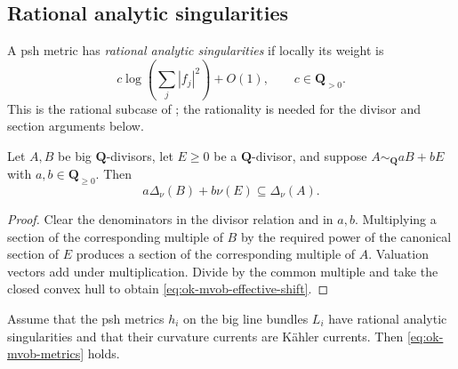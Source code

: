 \subsection{Rational analytic singularities}
\label{sec:ok-mixed-analytic}

\begin{definition}\label{def:ok-rational-analytic}
A psh metric has \emph{rational analytic singularities} if locally its
weight is
\[
 c\log\!\left(\sum_j|f_j|^2\right)+O(1),\qquad c\in\mathbf Q_{>0}.
\]
This is the rational subcase of
; the rationality is needed for
the divisor and section arguments below.
\end{definition}

\begin{lemma}\label{lem:ok-mvob-effective-shift}
Let $A,B$ be big $\mathbf Q$-divisors, let $E\geq0$ be a
$\mathbf Q$-divisor, and suppose
$A\sim_{\mathbf Q}aB+bE$ with $a,b\in\mathbf Q_{\geq0}$.  Then
\[
 a\Delta_\nu(B)+b\nu(E)\subseteq\Delta_\nu(A).
\tag{55.40}\label{eq:ok-mvob-effective-shift}
\]
\end{lemma}

\begin{proof}
Clear the denominators in the divisor relation and in $a,b$.  Multiplying
a section of the corresponding multiple of $B$ by the required power of
the canonical section of $E$ produces a section of the corresponding
multiple of $A$.  Valuation vectors add under multiplication.  Divide by
the common multiple and take the closed convex hull to obtain
\eqref{eq:ok-mvob-effective-shift}.
\end{proof}

\begin{proposition}\label{prop:ok-mvob-analytic-case}
Assume that the psh metrics $h_i$ on the big line bundles $L_i$ have
rational analytic singularities and that their curvature currents are
K\"ahler currents.  Then \eqref{eq:ok-mvob-metrics} holds.
\end{proposition}

